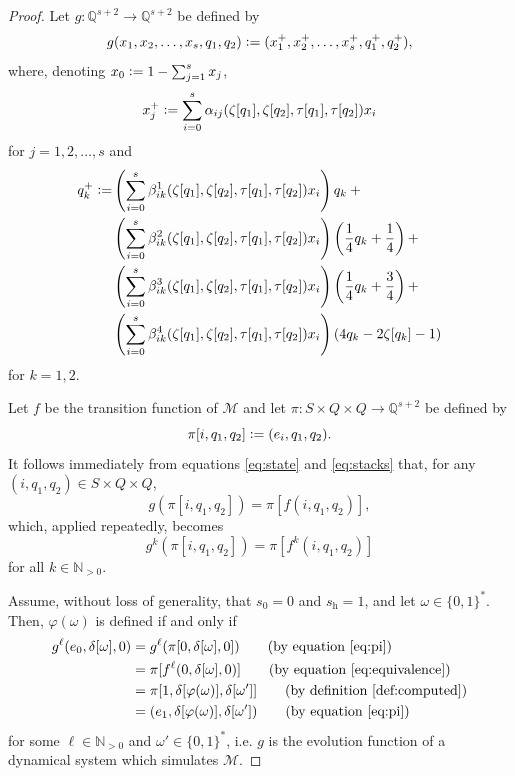 \documentclass{book}
\newcommand{\defeq}{\vcentcolon=}
\newcommand{\Q}{\mathbb{Q}}
\newcommand{\h}{\mathrm{h}}
\theoremstyle{definition}
\theoremstyle{plain}
\theoremstyle{plain}
\theoremstyle{remark}
\theoremstyle{plain}
\begin{document}
\begin{proof}
		Let $g:\Q^{s+2}\to\Q^{s+2}$ be defined by 
		\begin{equation} \label{eq:g}
			g(x_1,x_2,\dots,x_s,q_1,q_2)\defeq(x_1^+,x_2^+,\dots,x_s^+,q_1^+,q_2^+),
		\end{equation} 
		where, denoting $x_0\defeq1-\sum_{j=1}^{s}x_j$,
		\begin{equation} \label{eq:state}
			x_j^+\defeq\sum_{i=0}^{s}\alpha_{ij}(\zeta[q_1],\zeta[q_2],\tau[q_1],\tau[q_2])x_i
		\end{equation}
		for $j=1,2,\dots,s$ and
		\begin{align} \label{eq:stacks}
			\begin{split}
				q_k^+\defeq &\left(\sum_{i=0}^{s}\beta_{ik}^1(\zeta[q_1],\zeta[q_2],\tau[q_1],\tau[q_2])x_i\right)q_k\:+ \\
							&\left(\sum_{i=0}^{s}\beta_{ik}^2(\zeta[q_1],\zeta[q_2],\tau[q_1],\tau[q_2])x_i\right)
								\left(\frac{1}{4}q_k+\frac{1}{4}\right) + \\
							&\left(\sum_{i=0}^{s}\beta_{ik}^3(\zeta[q_1],\zeta[q_2],\tau[q_1],\tau[q_2])x_i\right)
								\left(\frac{1}{4}q_k+\frac{3}{4}\right) + \\
							&\left(\sum_{i=0}^{s}\beta_{ik}^4(\zeta[q_1],\zeta[q_2],\tau[q_1],\tau[q_2])x_i\right)
								\left(4q_k-2\zeta[q_k]-1\right)
			\end{split}
		\end{align}
		for $k=1,2$. 
		
		Let $f$ be the transition function of $\mathcal{M}$ and let $\pi:S\times Q\times Q\to\Q^{s+2}$ be defined by 
		\begin{equation}
			\pi[i,q_1,q_2] \defeq (e_i,q_1,q_2). \label{eq:pi}
		\end{equation} 
		It follows immediately from equations \ref{eq:state} and \ref{eq:stacks} that, for any $(i,q_1,q_2)\in S\times Q\times Q$,
		$$
			g(\pi[i,q_1,q_2])=\pi[f(i,q_1,q_2)],
		$$
		which, applied repeatedly, becomes 
		\begin{equation} \label{eq:equivalence}
			g^k(\pi[i,q_1,q_2])=\pi[f^k(i,q_1,q_2)]
		\end{equation}
		for all $k\in\mathbb{N}_{>0}$. 
		
		Assume, without loss of generality, that $s_0=0$ and $s_\h=1$, and let $\omega\in\{0,1\}^*$. Then, $\varphi(\omega)$ is defined if and only if
		\begin{align*}
			g^\ell(e_0,\delta[\omega],0) &= g^\ell(\pi[0,\delta[\omega],0]) \tag{by equation \ref{eq:pi}} \\
										 &= \pi[f^\ell(0,\delta[\omega],0)] \tag{by equation \ref{eq:equivalence}} \\
										 &= \pi[1,\delta[\varphi(\omega)],\delta[\omega']] \tag{by definition \ref{def:computed}} \\
										 &= (e_1,\delta[\varphi(\omega)],\delta[\omega']) \tag{by equation \ref{eq:pi}}
		\end{align*}
		for some $\ell\in\mathbb{N}_{>0}$ and $\omega'\in\{0,1\}^*$, i.e. $g$ is the evolution function of a dynamical system which simulates $\mathcal{M}$.
	\end{proof}
	
\end{document}
